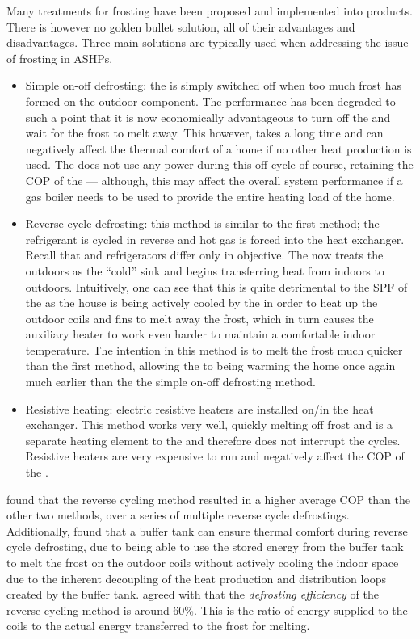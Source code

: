 Many treatments for frosting have been proposed and implemented into products. There is however no golden bullet solution, all of their advantages and disadvantages. Three main solutions are typically used when addressing the issue of frosting in \acp{ASHP}. 
\begin{itemize}
    \item Simple on-off defrosting: the \HP is simply switched off when too much frost has formed on the outdoor component. The performance has been degraded to such a point that it is now economically advantageous to turn off the \HP and wait for the frost to melt away. This however, takes a long time and can negatively affect the thermal comfort of a home if no other heat production is used. The \HP does not use any power during this off-cycle of course, retaining the \ac{COP} of the \HP --- although, this may affect the overall system performance if a gas boiler needs to be used to provide the entire heating load of the home.
    \item Reverse cycle defrosting: this method is similar to the first method; the refrigerant is cycled in reverse and hot gas is forced into the heat exchanger. Recall that \HPs and refrigerators differ only in objective. The \HP now treats the outdoors as the ``cold'' sink and begins transferring heat from indoors to outdoors. Intuitively, one can see that this is quite detrimental to the \ac{SPF} of the \HP as the house is being actively cooled by the \HP in order to heat up the outdoor coils and fins to melt away the frost, which in turn causes the auxiliary heater to work even harder to maintain a comfortable indoor temperature. The intention in this method is to melt the frost much quicker than the first method, allowing the \ASHP to being warming the home once again much earlier than the the simple on-off defrosting method.
    \item Resistive heating: electric resistive heaters are installed on/in the heat exchanger. This method works very well, quickly melting off frost and is a separate heating element to the \HP and therefore does not interrupt the \HPs cycles. Resistive heaters are very expensive to run and negatively affect the \ac{COP} of the \HP.
\end{itemize}

\cite{amer_review_2017} found that the reverse cycling method resulted in a higher average \ac{COP} than the other two methods, over a series of multiple reverse cycle defrostings. Additionally, \cite{bagarella_annual_2016} found that a buffer tank can ensure thermal comfort during reverse cycle defrosting, due to being able to use the stored energy from the buffer tank to melt the frost on the outdoor coils without actively cooling the indoor space due to the inherent decoupling of the heat production and distribution loops created by the buffer tank. \cite{bagarella_annual_2016} agreed with \cite{dong_2012} that the \textit{defrosting efficiency} of the reverse cycling method is around 60\%. This is the ratio of energy supplied to the coils to the actual energy transferred to the frost for melting. 

